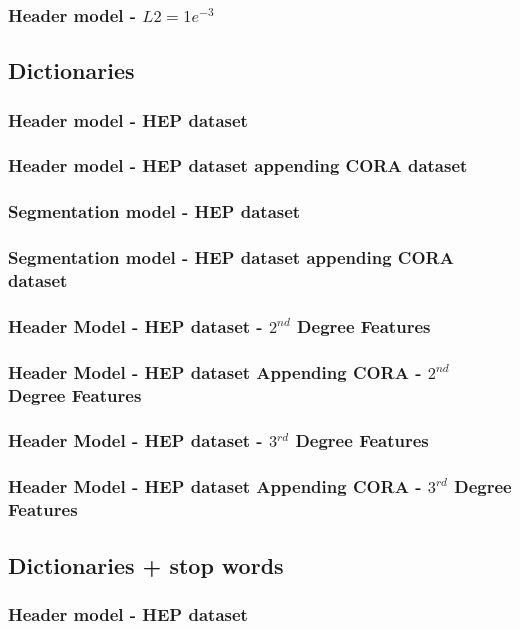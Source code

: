 \documentclass[10pt, oneside]{scrartcl}   	%
\begin{document}
\subsubsection{Header model - $L2 = 1e^{-3}$}
\subsection{Dictionaries}
\subsubsection{Header model - HEP dataset}
\subsubsection{Header model - HEP dataset appending CORA dataset}
\subsubsection{Segmentation model - HEP dataset}
\subsubsection{Segmentation model - HEP dataset appending CORA dataset}
\subsubsection{Header Model - HEP dataset - $2^{nd}$ Degree Features}
\subsubsection{Header Model - HEP dataset Appending CORA - $2^{nd}$ Degree Features}
\subsubsection{Header Model - HEP dataset - $3^{rd}$ Degree Features}
\subsubsection{Header Model - HEP dataset Appending CORA - $3^{rd}$ Degree Features}
\subsection{Dictionaries + stop words}
\subsubsection{Header model - HEP dataset}
\end{document}
